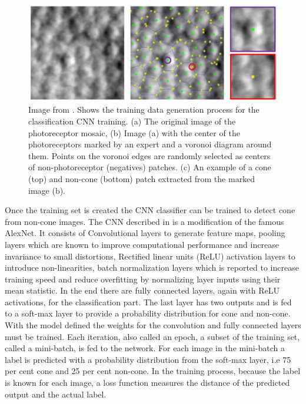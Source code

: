 \documentclass[]{article}
\begin{document}
\begin{figure}[h]
	\centering
	\includegraphics[width=\textwidth]{cunefare_generating_data.png}
	\caption{Image from \cite{cunefare_open_2017}. Shows the training data generation process for the classification CNN training. (a) The original image of the 
	photoreceptor mosaic, (b) Image (a) with the center of the photoreceptors marked by
    an expert and a voronoi diagram around them. Points on the voronoi edges are randomly
    selected as centers of non-photoreceptor (negatives) patches. 
    (c) An example of a cone (top) and non-cone (bottom) patch extracted from the marked image (b).  }
	\label{fig:cunefare-training-data-generation}
\end{figure}


Once the training set is created the CNN classifier can be trained to detect cone from non-cone images.
The CNN described in\cite{cunefare_open_2017} is a modification of the famous AlexNet\cite{krizhevsky_imagenet_2012}.
It consists of Convolutional layers to generate feature maps, pooling layers which are known to improve computational performance and increase invariance to small distortions\cite{jarrett_what_2009},
Rectified linear units (ReLU) activation layers to introduce non-linearities\cite{jarrett_what_2009},
batch normalization layers which is reported to increase training speed and reduce overfitting by normalizing layer inputs using their mean statistic\cite{ioffe_batch_2015}.
In the end there are fully connected  layers, again with ReLU activations, for the classification part.
The last layer has two outputs and is fed to a soft-max layer to provide a probability distribution for cone and non-cone\cite{bishop_pattern_recognition_2006}.
With the model defined the weights for the convolution and fully connected layers must be trained.
Each iteration, also called an epoch, a subset of the training set, called a mini-batch, is fed to the network.
For each image in the mini-batch a label is predicted with a probability distribution from the soft-max layer, i.e 75 per cent cone and 25 per cent non-cone.
In the training process, because the label is known for each image, 
a loss function measures the distance of the predicted output and the actual label.
\end{document}
